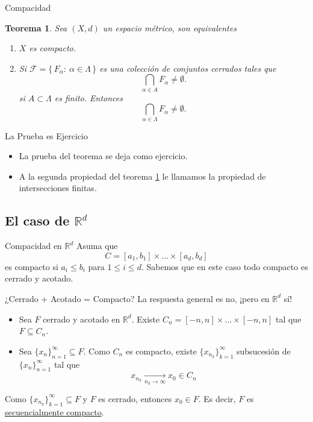 \documentclass[utf8]{beamer}
\theoremstyle{plain}
\newtheorem{Th}{Teorema}               %
\theoremstyle{definition}
\theoremstyle{remark}
\numberwithin{equation}{section}
\newcommand{\al}{\alpha}                %
\newcommand{\La}{\Lambda}               %
\newcommand{\bR}{\mathbb{R}}    %
\newcommand{\cF}{\mathcal{F}}           %
\newcommand{\set}[1]{\{\,#1\,\}}    %
\renewcommand{\leq}{\leqslant}          %
\newcommand{\un}{\underline}
\newcommand{\x}{\times}
\newcommand{\suck}{_{k=1}^\infty} %
\newcommand{\sucn}{_{n=1}^\infty} %
\begin{document}
\begin{frame}{Compacidad }
\begin{Th}\label{thm:equivCompacidadConIntersecc}
Sea $(X,d)$ un espacio m\'etrico, son equivalentes 
\begin{enumerate}
\item $X$ es compacto.
\item Si $\cF=\set{F_\al:\ \al\in\La}$ es 
una colecci\'on de conjuntos cerrados tales que 
$$ \bigcap_{\al\in A} F_\al\not= \emptyset.$$
si $A \subset \La$ es finito. Entonces 
$$ \bigcap_{\al\in \La} F_\al \not= \emptyset.$$
\end{enumerate}
\end{Th}

\end{frame}

\begin{frame}{La Prueba es Ejercicio}
  \begin{itemize}
  \item La prueba del teorema se deja como \alert{ejercicio}.
  \item A la segunda propiedad del teorema \ref{thm:equivCompacidadConIntersecc} le llamamos la \alert{propiedad de intersecciones finitas}.
  \end{itemize}
\end{frame}

\subsection{El caso de $\bR^d$}

\begin{frame}{Compacidad en $\bR^d$}
  Asuma que 
  $$C=[a_1,b_1]\x\dots\x[a_d,b_d]$$
  es compacto si $a_i\leq b_i$ para $1\leq i\leq d$. Sabemos que en este caso todo compacto es cerrado y acotado.
\end{frame}

\begin{frame}{¿Cerrado + Acotado = Compacto?}
  La respuesta general es no, ¡pero en $\bR^d$ sí!
  \begin{itemize}
    \item Sea $F$ cerrado y acotado en $\bR^d$. Existe $C_n=[-n,n]\x\dots\x[-n,n]$ tal que $F\subseteq C_n$.
    \item Sea $\{x_n\}\sucn\subseteq F$. Como $C_n$ es compacto, existe $\{x_{n_k}\}\suck$ subsucesión de $\{x_n\}\sucn$ tal que 
    $$x_{n_k}\xrightarrow[n_k\to\infty]{}x_0\in C_n$$
  \end{itemize}
  Como $\{x_{n_k}\}\suck\subseteq F$ y $F$ es cerrado, entonces $x_0\in F$. Es decir, $F$ es \un{secuencialmente compacto}.
\end{frame}
\end{document}
